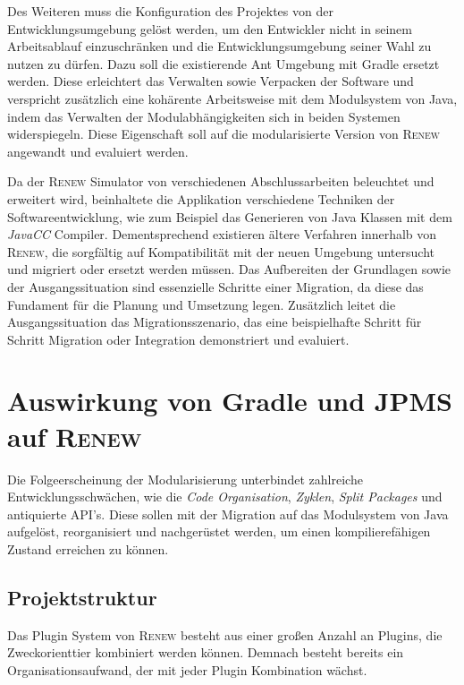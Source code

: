 	Des Weiteren muss die Konfiguration des Projektes von der Entwicklungsumgebung gelöst werden, um den Entwickler nicht in seinem Arbeitsablauf einzuschränken und die Entwicklungsumgebung seiner Wahl zu nutzen zu dürfen. Dazu soll die existierende Ant Umgebung mit Gradle ersetzt werden. Diese erleichtert das Verwalten sowie Verpacken der Software und verspricht zusätzlich eine kohärente Arbeitsweise mit dem Modulsystem von Java, indem das Verwalten der Modulabhängigkeiten sich in beiden Systemen widerspiegeln. Diese Eigenschaft soll auf die modularisierte Version von \textsc{Renew} angewandt und evaluiert werden. \bigbreak

	Da der \textsc{Renew} Simulator von verschiedenen Abschlussarbeiten beleuchtet und erweitert wird, beinhaltete die Applikation verschiedene Techniken der Softwareentwicklung, wie zum Beispiel das Generieren von Java Klassen mit dem \textit{JavaCC} Compiler. Dementsprechend existieren ältere Verfahren innerhalb von \textsc{Renew}, die sorgfältig auf Kompatibilität mit der neuen Umgebung untersucht und migriert oder ersetzt werden müssen. \bigbreak
	Das Aufbereiten der Grundlagen sowie der Ausgangssituation sind essenzielle Schritte einer Migration, da diese das Fundament für die Planung und Umsetzung legen. Zusätzlich leitet die Ausgangssituation das Migrationsszenario, das eine beispielhafte Schritt für Schritt Migration oder Integration demonstriert und evaluiert.\bigbreak

\section{Auswirkung von Gradle und JPMS auf \textsc{Renew}} \label{sec:auswirkung}
	Die Folgeerscheinung der Modularisierung unterbindet zahlreiche Entwicklungsschwächen, wie die \textit{Code Organisation}, \textit{Zyklen}, \textit{Split Packages} und antiquierte API's. Diese sollen mit der Migration auf das Modulsystem von Java aufgelöst, reorganisiert und nachgerüstet werden, um einen kompilierefähigen Zustand erreichen zu können.

	\subsection{Projektstruktur} \label{sub:projektstrukutr}
		Das Plugin System von \textsc{Renew} besteht aus einer großen Anzahl an Plugins, die Zweckorienttier kombiniert werden können. Demnach besteht bereits ein Organisationsaufwand, der mit jeder Plugin Kombination wächst. \bigbreak

